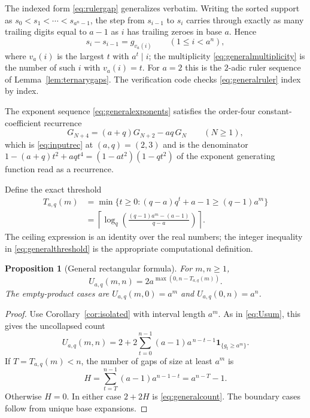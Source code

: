 \documentclass[11pt,letterpaper]{article}
\numberwithin{equation}{section}
\newtheorem{proposition}[theorem]{Proposition}
\theoremstyle{definition}
\theoremstyle{remark}
\newcommand{\ind}[1]{\boldsymbol{1}_{\{#1\}}}
\newcommand{\ceil}[1]{\left\lceil#1\right\rceil}
\begin{document}
The indexed form \eqref{eq:rulergap} generalizes verbatim. Writing the
sorted support as $s_0<s_1<\cdots<s_{a^n-1}$, the step from $s_{i-1}$ to
$s_i$ carries through exactly as many trailing digits equal to $a-1$ as
$i$ has trailing zeroes in base $a$. Hence
\begin{equation}\label{eq:generalruler}
 s_i-s_{i-1}=g_{v_a(i)}\qquad(1\le i<a^n),
\end{equation}
where $v_a(i)$ is the largest $t$ with $a^t\mid i$; the multiplicity
\eqref{eq:generalmultiplicity} is the number of such $i$ with $v_a(i)=t$.
For $a=2$ this is the $2$-adic ruler sequence of
Lemma~\ref{lem:ternarygaps}. The verification code checks
\eqref{eq:generalruler} index by index.

The exponent sequence \eqref{eq:generalexponents} satisfies the
order-four constant-coefficient recurrence
\begin{equation}\label{eq:generalinputrec}
 G_{N+4}=(a+q)G_{N+2}-aq\,G_N\qquad(N\ge1),
\end{equation}
which is \eqref{eq:inputrec} at $(a,q)=(2,3)$ and is the denominator
$1-(a+q)t^2+aqt^4=(1-at^2)(1-qt^2)$ of the exponent generating function
read as a recurrence.

Define the exact threshold
\begin{align}
 T_{a,q}(m)
 &=\min\{t\ge0:(q-a)q^t+a-1\ge(q-1)a^m\}\label{eq:generalthreshold}\\
 &=\ceil{\log_q\!\left(\frac{(q-1)a^m-(a-1)}{q-a}\right)}.
 \label{eq:generallogthreshold}
\end{align}
The ceiling expression is an identity over the real numbers; the integer
inequality in \eqref{eq:generalthreshold} is the appropriate computational
definition.

\begin{proposition}[General rectangular formula]\label{prop:generalcount}
For $m,n\ge1$,
\begin{equation}\label{eq:generalcount}
 U_{a,q}(m,n)=2a^{\max(0,n-T_{a,q}(m))}.
\end{equation}
The empty-product cases are
$U_{a,q}(m,0)=a^m$ and $U_{a,q}(0,n)=a^n$.
\end{proposition}
\begin{proof}
Use Corollary~\ref{cor:isolated} with interval length $a^m$. As in
\eqref{eq:Usum}, this gives the uncollapsed count
\begin{equation}\label{eq:generalUsum}
 U_{a,q}(m,n)=2+2\sum_{t=0}^{n-1}(a-1)a^{\,n-t-1}\ind{g_t\ge a^m}.
\end{equation}
If $T=T_{a,q}(m)<n$, the number of gaps of size at least $a^m$ is
\[
 H=\sum_{t=T}^{n-1}(a-1)a^{n-1-t}=a^{n-T}-1.
\]
Otherwise $H=0$. In either case $2+2H$ is \eqref{eq:generalcount}.
The boundary cases follow from unique base expansions.
\end{proof}
\end{document}
